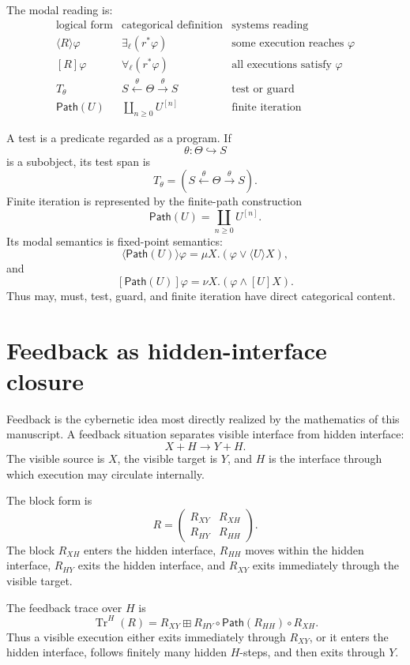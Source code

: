 The modal reading is:
\[
\begin{array}{c|c|c}
\text{logical form}
&
\text{categorical definition}
&
\text{systems reading}
\\
\hline
\langle R\rangle\varphi
&
\exists_{\ell}(r^\ast\varphi)
&
\text{some execution reaches }\varphi
\\
\left[R\right]\varphi
&
\forall_{\ell}(r^\ast\varphi)
&
\text{all executions satisfy }\varphi
\\
T_\theta
&
S\xleftarrow{\theta}\Theta\xrightarrow{\theta}S
&
\text{test or guard}
\\
\mathsf{Path}(U)
&
\coprod_{n\geq 0}U^{[n]}
&
\text{finite iteration}
\end{array}
\]

A test is a predicate regarded as a program.  If
\[
  \theta:\Theta\hookrightarrow S
\]
is a subobject, its test span is
\[
  T_\theta=
  \left(
    S\xleftarrow{\theta}\Theta\xrightarrow{\theta}S
  \right).
\]
Finite iteration is represented by the finite-path construction
\[
  \mathsf{Path}(U)
  =
  \coprod_{n\geq 0}U^{[n]}.
\]
Its modal semantics is fixed-point semantics:
\[
  \langle\mathsf{Path}(U)\rangle\varphi
  =
  \mu X.(\varphi\vee\langle U\rangle X),
\]
and
\[
  [\mathsf{Path}(U)]\varphi
  =
  \nu X.(\varphi\wedge[U]X).
\]
Thus may, must, test, guard, and finite iteration have direct categorical
content.

\section{Feedback as hidden-interface closure}
\label{sec:feedback-as-hidden-interface-closure}

Feedback is the cybernetic idea most directly realized by the mathematics of
this manuscript.  A feedback situation separates visible interface from
hidden interface:
\[
  X+H\longrightarrow Y+H.
\]
The visible source is \(X\), the visible target is \(Y\), and \(H\) is the
interface through which execution may circulate internally.

The block form is
\[
  R=
  \begin{pmatrix}
    R_{XY} & R_{XH}\\
    R_{HY} & R_{HH}
  \end{pmatrix}.
\]
The block \(R_{XH}\) enters the hidden interface, \(R_{HH}\) moves within the
hidden interface, \(R_{HY}\) exits the hidden interface, and \(R_{XY}\) exits
immediately through the visible target.

The feedback trace over \(H\) is
\[
  \operatorname{Tr}^{H}(R)
  =
  R_{XY}
  \boxplus
  R_{HY}\circ
  \mathsf{Path}(R_{HH})
  \circ
  R_{XH}.
\]
Thus a visible execution either exits immediately through \(R_{XY}\), or it
enters the hidden interface, follows finitely many hidden \(H\)-steps, and
then exits through \(Y\).


